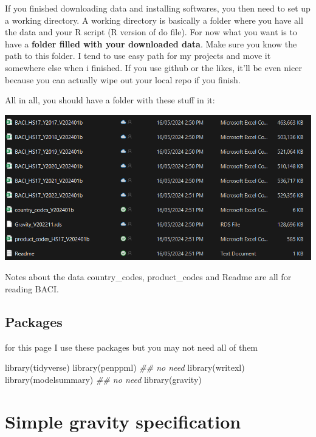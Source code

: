 \documentclass[
  a4paper,
  DIV=11,
  numbers=noendperiod]{scrreprt}
\newenvironment{Shaded}{\begin{snugshade}}{\end{snugshade}}
\newcommand{\DocumentationTok}[1]{\textcolor[rgb]{0.37,0.37,0.37}{\textit{#1}}}
\newcommand{\FunctionTok}[1]{\textcolor[rgb]{0.28,0.35,0.67}{#1}}
\newcommand{\NormalTok}[1]{\textcolor[rgb]{0.00,0.23,0.31}{#1}}
\begin{document}
If you finished downloading data and installing softwares, you then need
to set up a working directory. A working directory is basically a folder
where you have all the data and your R script (R version of do file).
For now what you want is to have a \textbf{folder filled with your
downloaded data}. Make sure you know the path to this folder. I tend to
use easy path for my projects and move it somewhere else when i
finished. If you use github or the likes, it'll be even nicer because
you can actually wipe out your local repo if you finish.

All in all, you should have a folder with these stuff in it:

\includegraphics{pic1.png}

Notes about the data country\_codes, product\_codes and Readme are all
for reading BACI.

\hypertarget{packages}{%
\subsection{Packages}\label{packages}}

for this page I use these packages but you may not need all of them

\begin{Shaded}
\begin{Highlighting}[numbers=left,,]
\FunctionTok{library}\NormalTok{(tidyverse)}
\FunctionTok{library}\NormalTok{(penppml) }\DocumentationTok{\#\# no need}
\FunctionTok{library}\NormalTok{(writexl)}
\FunctionTok{library}\NormalTok{(modelsummary) }\DocumentationTok{\#\# no need}
\FunctionTok{library}\NormalTok{(gravity)}
\end{Highlighting}
\end{Shaded}

\hypertarget{simple-gravity-specification}{%
\section{Simple gravity
specification}\label{simple-gravity-specification}}
\end{document}
